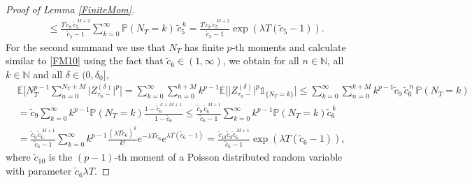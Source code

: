 \documentclass[11pt,a4paper]{article}
\numberwithin{equation}{section}
\theoremstyle{definition}
\newcommand{\E}{{\mathbb{E}}}
\newcommand{\N}{{\mathbb{N}}}
\renewcommand{\P}{{\mathbb{P}}}
\begin{document}
\begin{proof}[Proof of Lemma \ref{FiniteMom}]
\begin{equation}
\begin{aligned}
    &\leq \frac{T \, \widetilde c_8\,  \widetilde c_5^{\,M+2}}{ \widetilde c_5 -1 }   \sum_{k=0}^{\infty} \P(N_T = k)\, \widetilde c_5^{\,k}
    = \frac{T \, \widetilde c_8\,  \widetilde c_5^{\,M+2}}{ \widetilde c_5 -1 } \exp(\lambda T(\widetilde c_5-1)).
    \end{aligned}
\end{equation}
For the second summand we use that $N_T$ has finite $p$-th moments and calculate similar to \eqref{FM10} using the fact that $\widetilde c_6\in(1,\infty)$, we obtain for all $n\in\N$, all $k\in\N$ and all $\delta \in (0,\delta_0]$,
\begin{equation}
    \begin{aligned}\label{FM12}
    &\E\Big[ N_T^{p-1} \sum_{n=0}^{N_T + M} \big|Z^{(\delta)}_{\tau_{n}-}\big|^p \Big] 
    = \sum_{k=0}^\infty\sum_{n=0}^{k + M} k^{p-1} \E\Big[ \big|Z^{(\delta)}_{\tau_{n}-}\big|^p \mathds{1}_{\{N_T = k\}} \Big] 
    \leq \sum_{k=0}^\infty\sum_{n=0}^{k + M} k^{p-1} \widetilde c_9 \, \widetilde c_6^{\,n} \, \P(N_T =k) \\
    &= \widetilde c_9 \sum_{k=0}^\infty k^{p-1}  \P(N_T =k) \frac{1- \widetilde c_6^{\,k+M+1}}{1-\widetilde c_6}
    \leq \frac{\widetilde c_9\, \widetilde c_6^{\,M+1}}{\widetilde c_6-1}  \sum_{k=0}^\infty k^{p-1}  \P(N_T =k) \widetilde c_6^{\,k}\\
    &= \frac{\widetilde c_9\, \widetilde c_6^{\,M+1}}{\widetilde c_6-1}  \sum_{k=0}^\infty k^{p-1} \frac{(\lambda T \widetilde c_6)^k}{k!} e^{-\lambda T \widetilde c_6} e^{\lambda T(\widetilde c_6 -1)}
    = \frac{\widetilde c_{10} \widetilde c_9 \widetilde c_6^{\,M+1}}{\widetilde c_6-1} \exp(\lambda T(\widetilde c_6-1)),
    \end{aligned}
\end{equation}
where $\widetilde c_{10}$ is the $(p-1)$-th moment of a Poisson distributed random variable with parameter $\widetilde c_6 \lambda T$.
\end{proof}
\end{document}
